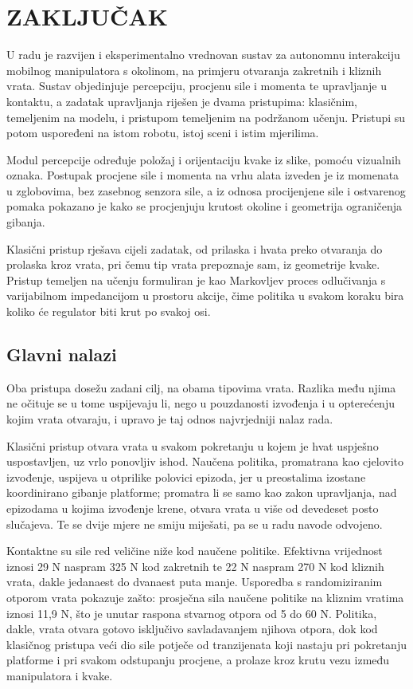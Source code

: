 \chapter{ZAKLJUČAK}
\label{ch:zakljucak}

U radu je razvijen i eksperimentalno vrednovan sustav za autonomnu interakciju mobilnog
manipulatora s okolinom, na primjeru otvaranja zakretnih i kliznih vrata. Sustav objedinjuje percepciju,
procjenu sile i momenta te upravljanje u kontaktu, a zadatak upravljanja riješen je dvama
pristupima: klasičnim, temeljenim na modelu, i pristupom temeljenim na podržanom učenju.
Pristupi su potom uspoređeni na istom robotu, istoj sceni i istim mjerilima.

Modul percepcije određuje položaj i orijentaciju kvake iz slike, pomoću vizualnih oznaka.
Postupak procjene sile i momenta na vrhu alata izveden je iz momenata u zglobovima, bez zasebnog
senzora sile, a iz odnosa procijenjene sile i ostvarenog pomaka pokazano je kako se procjenjuju
krutost okoline i geometrija ograničenja gibanja.

Klasični pristup rješava cijeli zadatak, od prilaska i hvata preko otvaranja do prolaska kroz
vrata, pri čemu tip vrata prepoznaje sam, iz geometrije kvake. Pristup temeljen na učenju
formuliran je kao Markovljev proces odlučivanja s varijabilnom impedancijom u prostoru akcije,
čime politika u svakom koraku bira koliko će regulator biti krut po svakoj osi.

\section{Glavni nalazi}

Oba pristupa dosežu zadani cilj, na obama tipovima vrata. Razlika među njima ne očituje se u tome
uspijevaju li, nego u pouzdanosti izvođenja i u opterećenju kojim vrata otvaraju, i upravo je taj
odnos najvrjedniji nalaz rada.

Klasični pristup otvara vrata u svakom pokretanju u kojem je hvat uspješno uspostavljen, uz vrlo
ponovljiv ishod. Naučena politika, promatrana kao cjelovito izvođenje, uspijeva u otprilike
polovici epizoda, jer u preostalima izostane koordinirano gibanje platforme; promatra li se samo
kao zakon upravljanja, nad epizodama u kojima izvođenje krene, otvara vrata u više od devedeset
posto slučajeva. Te se dvije mjere ne smiju miješati, pa se u radu navode odvojeno.

Kontaktne su sile red veličine niže kod naučene politike. Efektivna vrijednost iznosi 29 N
naspram 325 N kod zakretnih te 22 N naspram 270 N kod kliznih vrata, dakle jedanaest do dvanaest
puta manje. Usporedba s randomiziranim otporom vrata pokazuje zašto: prosječna sila naučene
politike na kliznim vratima iznosi 11,9 N, što je unutar raspona stvarnog otpora od 5 do 60 N.
Politika, dakle, vrata otvara gotovo isključivo savladavanjem njihova otpora, dok kod klasičnog
pristupa veći dio sile potječe od tranzijenata koji nastaju pri pokretanju platforme i pri svakom
odstupanju procjene, a prolaze kroz krutu vezu između manipulatora i kvake.

